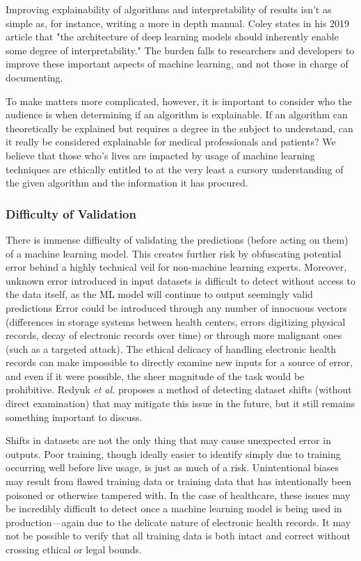 \documentclass[]{article}
\begin{document}
			Improving explainability of algorithms and interpretability of results isn't as simple as, for instance, writing a more in depth manual. Coley states in his 2019 article that "the architecture of deep learning models should inherently enable some degree of interpretability."\cite{ColeyRSC} The burden falls to researchers and developers to improve these important aspects of machine learning, and not those in charge of documenting.
			
			To make matters more complicated, however, it is important to consider who the audience is when determining if an algorithm is explainable. If an algorithm can theoretically be explained but requires a degree in the subject to understand, can it really be considered explainable for medical professionals and patients? We believe that those who's lives are impacted by usage of machine learning techniques are ethically entitled to at the very least a cursory understanding of the given algorithm and the information it has procured.

			\subsubsection{Difficulty of Validation}
				There is immense difficulty of validating the predictions (before acting on them) of a machine learning model. This creates further risk by obfuscating potential error behind a highly technical veil for non-machine learning experts. Moreover, unknown error introduced in input datasets is difficult to detect without access to the data itself, as the ML model will continue to output seemingly valid predictions\cite{10.1145/3328519.3329126} Error could be introduced through any number of innocuous vectors (differences in storage systems between health centers, errors digitizing physical records, decay of electronic records over time) or through more malignant ones (such as a targeted attack). The ethical delicacy of handling electronic health records\cite{ford2016privacy} can make impossible to directly examine new inputs for a source of error, and even if it were possible, the sheer magnitude of the task would be prohibitive. Redyuk \emph{et al.} proposes a method of detecting dataset shifts (without direct examination) that may mitigate this issue in the future\cite{10.1145/3328519.3329126}, but it still remains something important to discuss.

				Shifts in datasets are not the only thing that may cause unexpected error in outputs. Poor training, though ideally easier to identify simply due to training occurring well before live usage, is just as much of a risk. Unintentional biases may result from flawed training data\cite{7912315} or training data that has intentionally been poisoned or otherwise tampered with\cite{6868201}. In the case of healthcare, these issues may be incredibly difficult to detect once a machine learning model is being used in production---again due to the delicate nature of electronic health records. It may not be possible to verify that all training data is both intact and correct without crossing ethical or legal bounds.
				
\end{document}
